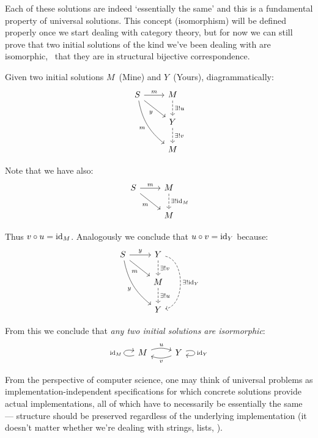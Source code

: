     Each of these solutions are indeed `essentially the same' and this is a
    fundamental property of universal solutions. This concept (isomorphism)
    will be defined properly once we start dealing with category theory, but for
    now we can still prove that two initial solutions of the kind we've been
    dealing with are isomorphic, \ie~that they are in structural bijective
    correspondence.
    
    Given two initial solutions $M$~(Mine) and $Y$~(Yours), diagrammatically:
    $$
    \begin{tikzcd}
        S \arrow[r, "m"] \arrow[rd, swap, "y"]
        \arrow[rdd, swap, bend right = 20, "m"] & 
        M \arrow[d, dashed, "\exists! u"] \\
        {} & Y \arrow[d, dashed, "\exists! v"] \\
        {} & M
    \end{tikzcd}
    $$
    
    Note that we have also:
    $$
    \begin{tikzcd}
        S \arrow[r, "m"] \arrow[rd, swap, "m"] & 
        M \arrow[d, dashed, "\exists! \id{M}"] \\
        {} & M
    \end{tikzcd}
    $$
    
    Thus $v \circ u = \mathrm{id}_{ M }$. Analogously we conclude that $u \circ v = \mathrm{id}_{ Y }$
    because:
    $$
    \begin{tikzcd}
        S \arrow[r, "y"] \arrow[rd, swap, "m"]
        \arrow[rdd, swap, bend right = 20, "y"] & 
        Y \arrow[d, dashed, "\exists! v"]
        \arrow[dd, dashed, bend left = 80, "\exists! \id{Y}"] \\
        {} & M \arrow[d, dashed, "\exists! u"] \\
        {} & Y
    \end{tikzcd}
    $$
    
    From this we conclude that \textit{any two initial solutions are isormorphic}:
    $$
    \begin{tikzcd}
        M \arrow[r, bend left = 20, "u"] \arrow[loop left, "\id{M}"] & 
        Y \arrow[l, bend left = 20, "v"] \arrow[loop right, "\id{Y}"]
    \end{tikzcd}
    $$
    
    From the perspective of computer science, one may think of universal problems
    as implementation-independent specifications for which concrete solutions
    provide actual implementations, all of which have to necessarily be
    essentially the same --- structure should be preserved regardless of the
    underlying implementation (it doesn't matter whether we're dealing with
    strings, lists, \etc).
    
